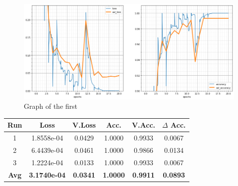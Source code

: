 \begin{figure}[H]
	\begin{center}
	\includegraphics[width=\linewidth]{Immagini/conv-pool-1}
	\caption{Graph of the first}
	\end{center}
\end{figure}
\begin{table}[H]
	\centering
	\begin{tabular}{cccccc}
		\textbf{Run} &\textbf{Loss}&\textbf{V.Loss} &\textbf{Acc.}&\textbf{V.Acc.}&\textbf{$\Delta$ Acc.} \\ \hline
		1   & 1.8558e-04 &  0.0429  & 1.0000    & 0.9933    & 0.0067\\
		2   & 6.4439e-04 &  0.0461  & 1.0000    & 0.9866    & 0.0134\\
		3   & 1.2224e-04 &  0.0133  & 1.0000    & 0.9933    & 0.0067\\
		\textbf{Avg} & \textbf{3.1740e-04} &  \textbf{0.0341}  & \textbf{1.0000}    & \textbf{0.9911}    & \textbf{0.0893}
	\end{tabular}
\end{table}
